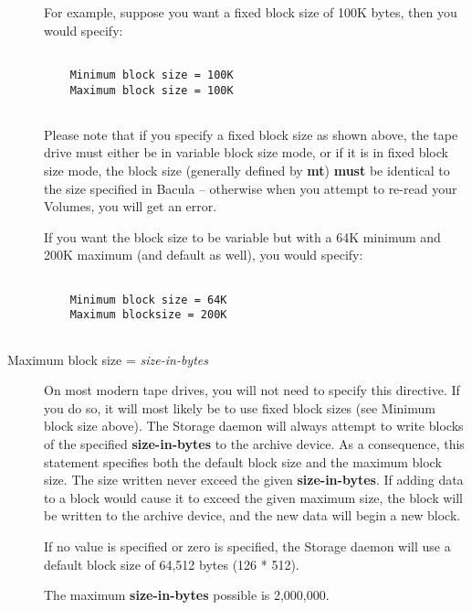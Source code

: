 \begin{description}
   For  example, suppose you want a fixed block size of 100K bytes, then you 
   would specify:  

\footnotesize
\begin{verbatim}
 
    Minimum block size = 100K
    Maximum block size = 100K
    
\end{verbatim}
\normalsize

   Please note that if you specify a fixed block size as shown above,  the tape
   drive must either be in variable block size mode, or  if it is in fixed block
   size mode, the block size (generally  defined by {\bf mt}) {\bf must} be
   identical to the size specified  in Bacula -- otherwise when you attempt to
   re-read your Volumes,  you will get an error.  
   
   If you want the  block size to be variable but with a 64K minimum and 200K
   maximum (and  default as well), you would specify:  

\footnotesize
\begin{verbatim}
 
    Minimum block size = 64K
    Maximum blocksize = 200K
   
\end{verbatim}
\normalsize

\item [Maximum block size = {\it size-in-bytes}]
   On most modern tape drives, you will not need to specify this directive.
   If you do so, it will most likely be to use fixed block sizes (see
   Minimum block size above).  The Storage daemon will always attempt to
   write blocks of the specified {\bf size-in-bytes} to the archive device.
   As a consequence, this statement specifies both the default block size
   and the maximum block size.  The size written never exceed the given
   {\bf size-in-bytes}.  If adding data to a block would cause it to exceed
   the given maximum size, the block will be written to the archive device,
   and the new data will begin a new block.
   
   If no value is specified or zero is specified, the Storage daemon will
   use a default block size of 64,512 bytes (126 * 512).

   The maximum {\bf size-in-bytes} possible is 2,000,000.


\end{description}
